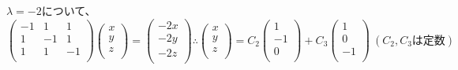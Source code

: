 \documentclass[]{jsarticle}
\begin{document}
        $\lambda = -2$について、
        \begin{equation*}
            \begin{pmatrix}
                -1 & 1 & 1 \\
                1 & -1 & 1 \\
                1 & 1 & -1 \\
            \end{pmatrix}
            \begin{pmatrix}
                x \\
                y \\
                z \\
            \end{pmatrix} =
            \begin{pmatrix}
                -2x \\
                -2y \\
                -2z \\
            \end{pmatrix}
            \therefore
            \begin{pmatrix}
                x \\
                y \\
                z \\
            \end{pmatrix} =
            C_2\begin{pmatrix}
                1 \\
                -1 \\
                0 \\
            \end{pmatrix} +
            C_3\begin{pmatrix}
                1 \\
                0 \\
                -1 \\
            \end{pmatrix} \
            (C_2, C_3は定数)
        \end{equation*}
\end{document}
